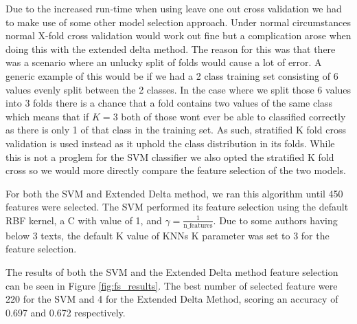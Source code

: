 Due to the increased run-time when using leave one out cross validation we had
to make use of some other model selection approach. Under normal circumstances
normal X-fold cross validation would work out fine but a complication arose when
doing this with the extended delta method. The reason for this was that there
was a scenario where an unlucky split of folds would cause a lot of error. A
generic example of this would be if we had a 2 class training set consisting
of 6 values evenly split between the 2 classes. In the case where we split
those 6 values into 3 folds there is a chance that a fold contains two values
of the same class which means that if $K = 3$ both of those wont ever be able
to classified correctly as there is only 1 of that class in the training set.
As such, stratified K fold cross validation is used instead as it uphold the
class distribution in its folds. While this is not a proglem for the \gls{SVM}
classifier we also opted the stratified K fold cross so we would more directly
compare the feature selection of the two models.

For both the \gls{SVM} and Extended Delta method, we ran this algorithm
until 450 features were selected. The \gls{SVM} performed its feature selection
using the default RBF kernel, a C with value of 1, and $\gamma =
\frac{1}{\text{n\_features}}$. Due to some authors having below 3 texts,
the default K value of \gls{KNN}s K parameter was set to 3 for the feature
selection.

The results of both the SVM and the Extended Delta method feature selection can
be seen in Figure \ref{fig:fs_results}. The best number of selected feature were
220 for the SVM and 4 for the Extended Delta Method, scoring an accuracy of
0.697 and 0.672 respectively.

